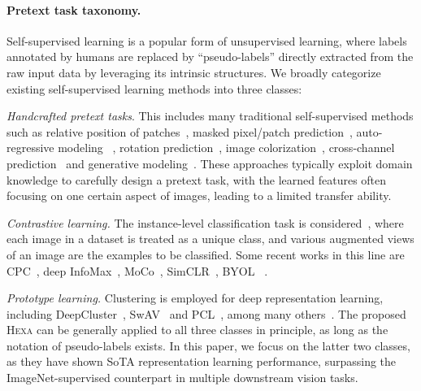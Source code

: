 \documentclass[10pt,twocolumn,letterpaper]{article}
\newcommand{\shortname}{\textsc{Hexa}}
\begin{document}
\paragraph{Pretext task taxonomy.}
Self-supervised learning is a popular form of unsupervised learning, where  labels annotated by humans are replaced by ``pseudo-labels'' directly extracted from the raw input data by leveraging its intrinsic structures. We broadly categorize existing self-supervised learning methods into three classes: 

{\em Handcrafted pretext tasks}. This includes many traditional self-supervised methods such as relative position of patches~\cite{doersch2015unsupervised,noroozi2016unsupervised}, masked pixel/patch prediction~\cite{pathak2016context,trinh2019selfie}, auto-regressive modeling~\cite{chen2020generative} , rotation prediction~\cite{gidaris2018unsupervised}, image colorization~\cite{zhang2016colorful,larsson2016learning}, cross-channel prediction~\cite{zhang2017split} and generative modeling~\cite{pu2016variational,donahue2019large}. These approaches typically exploit domain knowledge to carefully design a pretext task, with the learned features often focusing on one certain aspect of images, leading to a limited transfer ability.
 
{\em Contrastive learning.} The instance-level classification task is considered~\cite{dosovitskiy2015discriminative,zhuang2019local}, where each image in a dataset is treated as a unique class, and various augmented views of an image are the examples to be classified. Some recent works in this line are CPC~\cite{oord2018representation}, deep InfoMax~\cite{hjelm2018learning,bachman2019learning}, MoCo~\cite{he2020momentum}, SimCLR~\cite{chen2020simple}, BYOL~\cite{grill2020bootstrap} \etc.

{\em Prototype learning.} Clustering is employed for deep representation learning, including DeepCluster~\cite{caron2018deepcluster}, SwAV~\cite{caron2020unsupervised} and PCL~\cite{li2020prototypical}, among many others~\cite{xie2016unsupervised,yang2016joint,ji2019invariant,zhan2020online}. 
The proposed \shortname{} can be generally applied to all three classes in principle, as long as the notation of pseudo-labels exists. In this paper, we focus on the latter two classes, as they have shown SoTA representation learning performance, surpassing the ImageNet-supervised counterpart in multiple downstream vision tasks.
\end{document}
